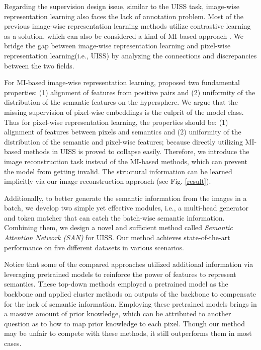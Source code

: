 \documentclass[letterpaper]{article} \usepackage{aaai23}  \usepackage{times}  \usepackage{helvet}  \usepackage{courier}  \usepackage[hyphens]{url}  \usepackage{graphicx} \urlstyle{rm} \def\UrlFont{\rm}  \usepackage{natbib}  \usepackage{caption} \frenchspacing  \setlength{\pdfpagewidth}{8.5in}  \setlength{\pdfpageheight}{11in}  \usepackage{algorithm}
\begin{document}
Regarding the supervision design issue, similar to the UISS task, image-wise representation learning also faces the lack of annotation problem. Most of the previous image-wise representation learning methods utilize contrastive learning as a solution, which can also be considered a kind of MI-based approach \cite{hjelm2018learning}. We bridge the gap between image-wise representation learning and pixel-wise representation learning(i.e., UISS) by analyzing the connections and discrepancies between the two fields.

For MI-based image-wise representation learning, \cite{wang2020understanding} proposed two fundamental properties: (1) alignment of features from positive pairs and (2) uniformity of the distribution of the semantic features on the hypersphere. We argue that the missing supervision of pixel-wise embeddings is the culprit of the model class. Thus for pixel-wise representation learning, the properties should be: (1) alignment of features between pixels and semantics and (2) uniformity of the distribution of the semantic and pixel-wise features; because directly utilizing MI-based methods in UISS is proved to collapse easily. Therefore, we introduce the image reconstruction task instead of the MI-based methods, which can prevent the model 
from getting invalid. The structural information can be learned implicitly via our image reconstruction approach (see Fig. \ref{result}).
 
Additionally, to better generate the semantic information from the images in a batch, we develop two simple yet effective modules, i.e., a multi-head generator and token matcher that can catch the batch-wise semantic information. Combining them, we design a novel and sufficient method called \textit{Semantic Attention Network (SAN)} for UISS.
Our method achieves state-of-the-art performance on five different datasets in various scenarios. 

Notice that some of the compared approaches utilized additional information via leveraging pretrained models to reinforce the power of features to represent semantics. These top-down methods employed a pretrained model as the backbone and applied cluster methods on outputs of the backbone to compensate for the lack of semantic information. Employing these pretrained models brings in a massive amount of prior knowledge, which can be attributed to another question as to how to map prior knowledge to each pixel. Though our method may be unfair to compete with these methods, it still outperforms them in most cases.
\end{document}
